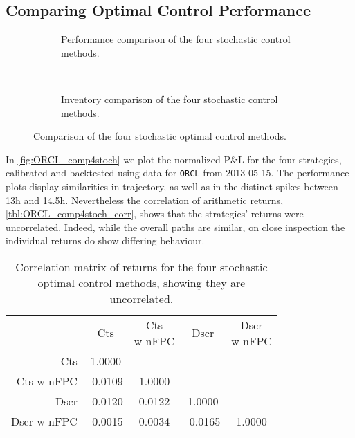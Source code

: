 \subsection{Comparing Optimal Control Performance}

\begin{figure}%
  \centering%
\begin{subfigure}[b]{0.9\linewidth}%
  \setlength{}%
  \setlength\figurewidth{\linewidth}%
  \caption{Performance comparison of the four stochastic control methods.}\label{fig:ORCL_comp4stoch}%
\end{subfigure}\\%
\vspace{1cm}%
\begin{subfigure}[b]{0.9\linewidth}%
  \centering%
  \setlength{}%
  \setlength\figurewidth{\linewidth}%
  \caption{Inventory comparison of the four stochastic control methods.}\label{fig:ORCL_comp4stoch_inv}%
\end{subfigure}%
\caption[Comparison of the four stochastic optimal control methods]{Comparison of the four stochastic optimal control methods.}%
\end{figure}
In \autoref{fig:ORCL_comp4stoch} we plot the normalized P\&L for the four strategies, calibrated and backtested using data for \texttt{ORCL} from 2013-05-15. The performance plots display similarities in trajectory, as well as in the distinct spikes between 13h and 14.5h. Nevertheless the correlation of arithmetic returns, \autoref{tbl:ORCL_comp4stoch_corr}, shows that the strategies' returns were uncorrelated. Indeed, while the overall paths are similar, on close inspection the individual returns do show differing behaviour.
\begin{table}[H]
\centering
{}
\begin{tabular}{@{} r *{4}{c} @{}}
\toprule
& Cts & \cellbreak{t}{c}{Cts \\ w nFPC} & Dscr & \cellbreak{t}{c}{Dscr \\ w nFPC} \\
\cmidrule{2-5}
Cts          &  1.0000  & & & \\
Cts w nFPC   & -0.0109  &  1.0000 &  & \\
Dscr         & -0.0120  &  0.0122 &   1.0000 &  \\
Dscr w nFPC  & -0.0015  &  0.0034 &  -0.0165 &   1.0000 \\
\bottomrule
\end{tabular}
\caption[Correlation matrix of stochastic optimal control returns]{Correlation matrix of returns for the four stochastic optimal control methods, showing they are uncorrelated.}
\label{tbl:ORCL_comp4stoch_corr}
\end{table}
